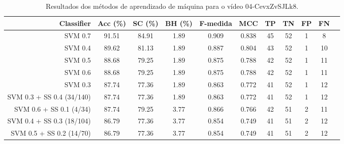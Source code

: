 \begin{table}[!htb]
\centering
\caption{Resultados dos métodos de aprendizado de máquina para o vídeo 04-CevxZvSJLk8.}
\label{tab:04-CevxZvSJLk8}
\begin{tabular}{r|c|c|c|c|c|c|c|c|c|c}
\hline\hline
Classifier & Acc (\%) & SC (\%) & BH (\%) & F-medida & MCC & TP & TN & FP & FN \\ \hline
SVM 0.7 & 91.51 & 84.91 & 1.89 & 0.909 & 0.838 & 45 & 52 & 1 & 8 \\ 
SVM 0.4 & 89.62 & 81.13 & 1.89 & 0.887 & 0.804 & 43 & 52 & 1 & 10 \\ 
SVM 0.5 & 88.68 & 79.25 & 1.89 & 0.875 & 0.788 & 42 & 52 & 1 & 11 \\ 
SVM 0.6 & 88.68 & 79.25 & 1.89 & 0.875 & 0.788 & 42 & 52 & 1 & 11 \\ 
SVM 0.3 & 87.74 & 77.36 & 1.89 & 0.863 & 0.772 & 41 & 52 & 1 & 12 \\ 
SVM 0.3 + SS 0.4 (34/140) & 87.74 & 77.36 & 1.89 & 0.863 & 0.772 & 41 & 52 & 1 & 12 \\ 
SVM 0.6 + SS 0.1 (4/34) & 87.74 & 79.25 & 3.77 & 0.866 & 0.766 & 42 & 51 & 2 & 11 \\ 
SVM 0.4 + SS 0.3 (18/104) & 86.79 & 77.36 & 3.77 & 0.854 & 0.749 & 41 & 51 & 2 & 12 \\ 
SVM 0.5 + SS 0.2 (14/70) & 86.79 & 77.36 & 3.77 & 0.854 & 0.749 & 41 & 51 & 2 & 12 \\ 
\hline\hline
\end{tabular}
\end{table}
